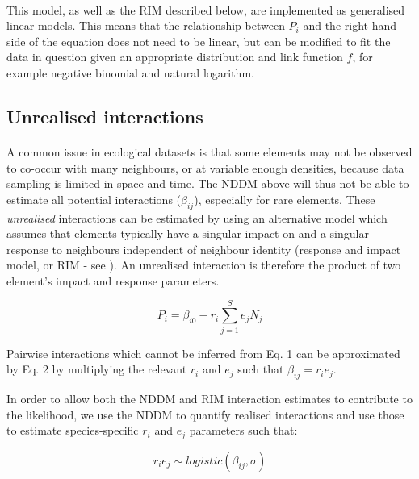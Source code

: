 \documentclass[a4,12pt]{article}
\begin{document}
        \paragraph{}
        This model, as well as the RIM described below, are implemented as generalised linear models. This means that the relationship between $P_i$ and the right-hand side of the equation does not need to be linear, but can be modified to fit the data in question given an appropriate distribution and link function $f$, for example negative binomial and natural logarithm. 
              
    \subsection{Unrealised interactions}

    \paragraph{}
       A common issue in ecological datasets is that some elements may not be observed to co-occur with many neighbours, or at variable enough densities, because data sampling is limited in space and time. The NDDM above will thus not be able to estimate all potential interactions ($\beta_{ij}$), especially for rare elements. These \textit{unrealised} interactions can be estimated by using an alternative model which assumes that elements typically have a singular impact on and a singular response to neighbours independent of neighbour identity (response and impact model, or RIM - see \cite{Godoy2014b}). An unrealised interaction is therefore the product of two element's impact and response parameters. 

        \begin{equation}
        P_{i} = \beta_{i0} - r_{i} \sum_{j=1}^{S} e_{j} N_{j}
        \label{rim}
        \end{equation}
        
        Pairwise interactions which cannot be inferred from Eq. 1 can be approximated by Eq. 2 by multiplying the relevant $r_{i}$ and $e_{j}$ such that $\beta_{ij} = r_{i} e_{j}$. 

        In order to allow both the NDDM and RIM interaction estimates to contribute to the likelihood, we use the NDDM to quantify realised interactions and use those to estimate species-specific $r_i$ and $e_j$ parameters such that: 
    
        \begin{equation}
        r_i e_j \sim logistic \left ( \beta_{ij}, \sigma \right )
        \label{unrealised}
        \end{equation}
    
\end{document}
